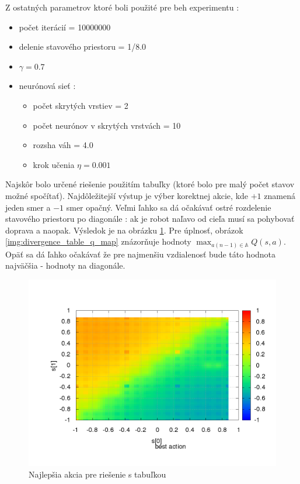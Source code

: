 Z ostatných parametrov ktoré boli použité pre beh experimentu :

\begin{itemize}
\item počet iterácií = 10000000
\item delenie stavového priestoru = 1/8.0
\item $\gamma = 0.7$
\item neurónová sieť :
  \begin{itemize}
  \item počet skrytých vrstiev = 2
  \item počet neurónov v skrytých vrstvách = 10
  \item rozsha váh = 4.0
  \item krok učenia $\eta = 0.001$
  \end{itemize}
\end{itemize}

Najskôr bolo určené riešenie použitím tabuľky (ktoré bolo pre malý počet stavov možné spočítať).
Najdôležitejší výstup je výber korektnej akcie, kde $+1$ znamená jeden smer a $-1$ smer opačný.
Veľmi ľahko sa dá očakávať ostré rozdelenie stavového priestoru po diagonále :
ak je robot naľavo od cieľa musí sa pohybovať doprava a naopak. Výsledok je na obrázku
\ref{img:divergence_table_action}. Pre úplnosť, obrázok \ref{img:divergence_table_q_map}
znázorňuje hodnoty $\max_{a(n-1) \in \mathbb{A}} Q(s, a)$. Opäť sa dá ľahko očakávať
že pre najmenšiu vzdialenosť bude táto hodnota najväčšia - hodnoty na diagonále.


\begin{figure}[!htb]
\centering
\includegraphics[scale=.4]{../../results_q_learning/experiment_divergence/table/q_action.png}
\caption{Najlepšia akcia pre riešenie s tabuľkou}
\label{img:divergence_table_action}
\end{figure}


